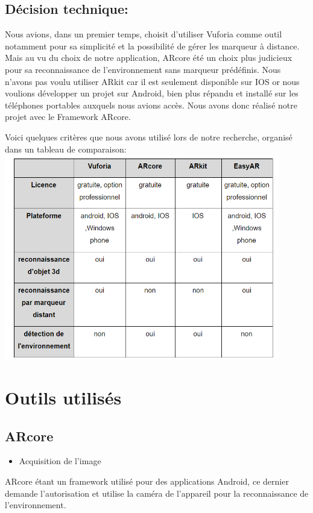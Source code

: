 \documentclass[12pt]{article}
\begin{document}
\subsection{Décision technique:}
\par
Nous avions, dans un premier temps, choisit d'utiliser Vuforia comme outil notamment pour sa simplicité et la possibilité de gérer les marqueur à distance. Mais au vu du choix de notre application, ARcore été un choix plus judicieux pour sa reconnaissance de l'environnement sans marqueur prédéfinis. Nous n'avons pas voulu utiliser ARkit car il est seulement disponible sur IOS or nous voulions développer un projet sur Android, bien plus répandu et installé sur les téléphones portables auxquels nous avions accès. Nous avons donc réalisé notre projet avec le Framework ARcore.

\par
Voici quelques critères que nous avons utilisé lors de notre recherche, organisé dans un tableau de comparaison:\newline
\includegraphics[width=0.9\textwidth]{tableauComparaison.png}

	
\section{Outils utilisés}
	\subsection{ARcore}
		\begin{itemize}
			\item Acquisition de l'image
		\end{itemize}
		\par
		ARcore étant un framework utilisé pour des applications Android, ce dernier demande l'autorisation et utilise la caméra de l'appareil pour la reconnaissance de l'environnement.
\end{document}
